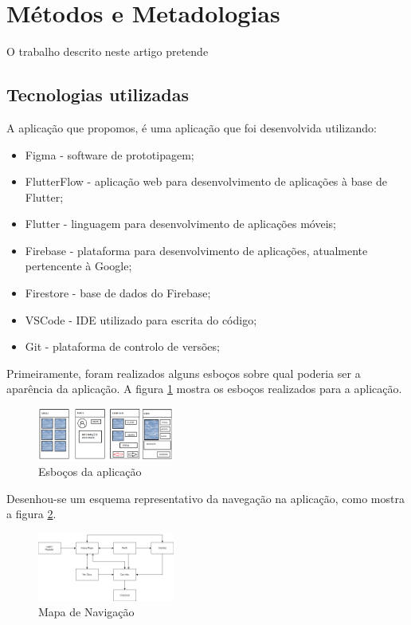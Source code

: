 \documentclass[conference]{IEEEtran}
\begin{document}
\section{Métodos e Metadologias}

O trabalho descrito neste artigo pretende 

\subsection{Tecnologias utilizadas}

A aplicação que propomos, é uma aplicação que foi desenvolvida utilizando:

\begin{itemize}
    \item Figma - software de prototipagem;
    \item FlutterFlow - aplicação web para desenvolvimento de aplicações à base de Flutter;
    \item Flutter - linguagem para desenvolvimento de aplicações móveis;
    \item Firebase - plataforma para desenvolvimento de aplicações, atualmente pertencente à Google;
    \item Firestore - base de dados do Firebase;
    \item VSCode - IDE utilizado para escrita do código;
    \item Git - plataforma de controlo de versões;
\end{itemize}

Primeiramente, foram realizados alguns esboços sobre qual poderia ser a aparência da aplicação. A figura \ref{fig:sketches} 
mostra os esboços realizados para a aplicação.

\begin{figure}[ht]
    \centering
    \includegraphics[width=0.4\textwidth]{appsketches.png}
    \caption{Esboços da aplicação}
    \label{fig:sketches}
\end{figure}

Desenhou-se um esquema representativo da navegação na aplicação, como mostra a figura \ref{fig:navmap}.

\begin{figure}[ht]
    \centering
    \includegraphics[width=0.4\textwidth]{artstore+map.drawio.png}
    \caption{Mapa de Navigação}
    \label{fig:navmap}
\end{figure}
\end{document}
